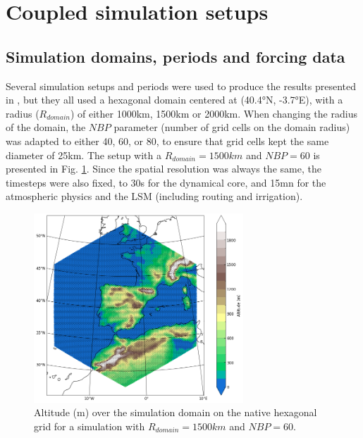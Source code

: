 \section{Coupled simulation setups}
\label{sec:sim_setups}
\subsection{Simulation domains, periods and forcing data}

Several simulation setups and periods were used to produce the results presented in \atmchapters, but they all used a hexagonal domain centered at (40.4°N, -3.7°E), with a radius ($R_{domain}$) of either 1000km, 1500km or 2000km. When changing the radius of the domain, the $NBP$ parameter (number of grid cells on the domain radius) was adapted to either 40, 60, or 80, to ensure that grid cells kept the same diameter of 25km. The setup with a $R_{domain}=1500 km$ and $NBP=60$ is presented in Fig. \ref{fig:domain_full_hex}. 
Since the spatial resolution was always the same, the timesteps were also fixed, to 30s for the dynamical core, and 15mn for the atmospheric physics and the LSM (including routing and irrigation). 

\begin{figure}[hbtp]
    \centering
    \includegraphics[width=0.7\textwidth]{images/chap4/article/f01.png}
    \caption{Altitude (m) over the simulation domain on the native hexagonal grid for a simulation with $R_{domain}=1500 km$ and $NBP=60$.}
    \label{fig:domain_full_hex}
\end{figure}



